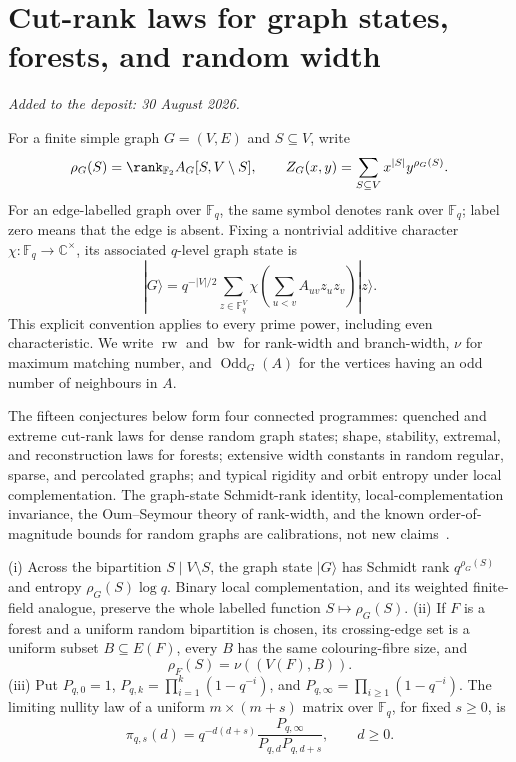 \part{Cut-rank laws for graph states, forests, and random width}

\medskip\noindent\emph{Added to the deposit: 30 August 2026.}\par\medskip

For a finite simple graph $G=(V,E)$ and $S\subseteq V$, write
\[
 \rho_G(S)=\rank_{\mathbb F_2}A_G[S,V\setminus S],\qquad
 Z_G(x,y)=\sum_{S\subseteq V}x^{|S|}y^{\rho_G(S)}.
\]
For an edge-labelled graph over $\mathbb F_q$, the same symbol denotes rank
over $\mathbb F_q$; label zero means that the edge is absent.  Fixing a
nontrivial additive character $\chi\colon\mathbb F_q\to\mathbb C^\times$, its
associated $q$-level graph state is
\[
 |G\rangle=q^{-|V|/2}\sum_{z\in\mathbb F_q^V}
 \chi\!\left(\sum_{u<v}A_{uv}z_uz_v\right)|z\rangle .
\]
This explicit convention applies to every prime power, including even
characteristic.  We write $\operatorname{rw}$
and $\operatorname{bw}$ for rank-width and branch-width, $\nu$ for maximum
matching number, and $\operatorname{Odd}_G(A)$ for the vertices having an odd
number of neighbours in $A$.

The fifteen conjectures below form four connected programmes: quenched and
extreme cut-rank laws for dense random graph states; shape, stability,
extremal, and reconstruction laws for forests; extensive width constants in
random regular, sparse, and percolated graphs; and typical rigidity and orbit
entropy under local complementation.  The graph-state Schmidt-rank identity,
local-complementation invariance, the Oum--Seymour theory of rank-width, and
the known order-of-magnitude bounds for random graphs are calibrations, not
new claims~\cite{HeinEisertBriegel04,Oum05,OumSeymour06,LeeLeeOum12}.

\begin{proposition}\label{as:basic}
\textup{(i)} Across the bipartition $S\mid V\setminus S$, the graph state
$|G\rangle$ has Schmidt rank $q^{\rho_G(S)}$ and entropy
$\rho_G(S)\log q$.  Binary local complementation, and its weighted
finite-field analogue, preserve the whole labelled function
$S\mapsto\rho_G(S)$.  \textup{(ii)} If $F$ is a forest and a
uniform random bipartition is chosen, its crossing-edge set is a uniform
subset $B\subseteq E(F)$, every $B$ has the same colouring-fibre size, and
\[
 \rho_F(S)=\nu((V(F),B)).
\]
\textup{(iii)} Put $P_{q,0}=1$,
$P_{q,k}=\prod_{i=1}^k(1-q^{-i})$, and
$P_{q,\infty}=\prod_{i\ge1}(1-q^{-i})$.  The limiting nullity law of a
uniform $m\times(m+s)$ matrix over $\mathbb F_q$, for fixed $s\ge0$, is
\[
 \pi_{q,s}(d)=q^{-d(d+s)}
 \frac{P_{q,\infty}}{P_{q,d}P_{q,d+s}},\qquad d\ge0.
\]
\end{proposition}

